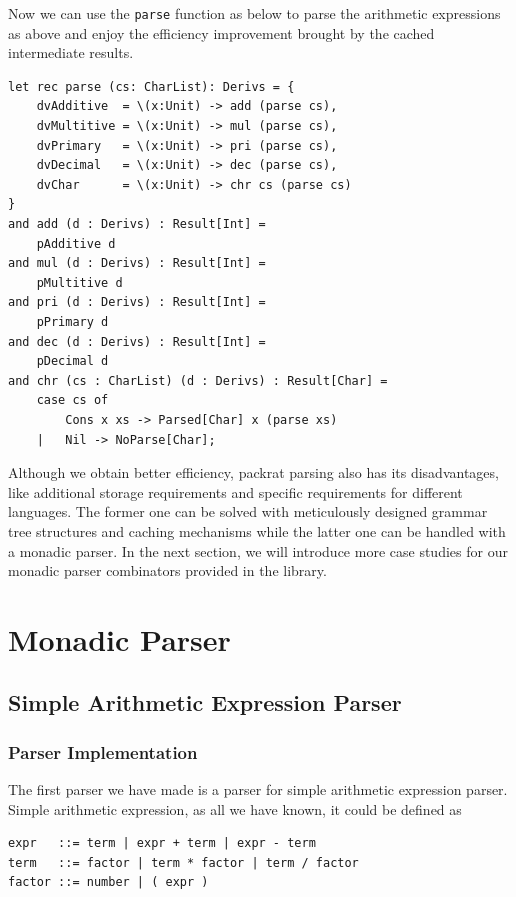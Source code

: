 Now we can use the \texttt{parse} function as below to parse the arithmetic expressions as above and enjoy the efficiency improvement brought by the cached intermediate results.

\begin{lstlisting}
let rec parse (cs: CharList): Derivs = {
    dvAdditive  = \(x:Unit) -> add (parse cs),
    dvMultitive = \(x:Unit) -> mul (parse cs),
    dvPrimary   = \(x:Unit) -> pri (parse cs),
    dvDecimal   = \(x:Unit) -> dec (parse cs),
    dvChar      = \(x:Unit) -> chr cs (parse cs)
}
and add (d : Derivs) : Result[Int] =
    pAdditive d
and mul (d : Derivs) : Result[Int] =
    pMultitive d
and pri (d : Derivs) : Result[Int] =
    pPrimary d
and dec (d : Derivs) : Result[Int] =
    pDecimal d
and chr (cs : CharList) (d : Derivs) : Result[Char] =
    case cs of
        Cons x xs -> Parsed[Char] x (parse xs)
    |   Nil -> NoParse[Char];
\end{lstlisting}

Although we obtain better efficiency, packrat parsing also has its disadvantages, like additional storage requirements and specific requirements for different languages. The former one can be solved with meticulously designed grammar tree structures and caching mechanisms while the latter one can be handled with a monadic parser. In the next section, we will introduce more case studies for our monadic parser combinators provided in the library.

\section{Monadic Parser}

\subsection{Simple Arithmetic Expression Parser} \label{section:simple_arith_expr_parser}

\subsubsection{Parser Implementation}

The first parser we have made is a parser for simple arithmetic expression parser. Simple arithmetic expression, as all we have known, it could be defined as

\begin{lstlisting}[language={}]
expr   ::= term | expr + term | expr - term
term   ::= factor | term * factor | term / factor
factor ::= number | ( expr )
\end{lstlisting}

